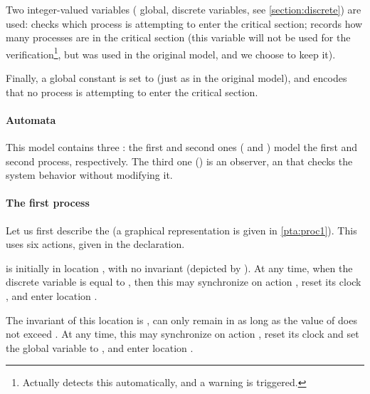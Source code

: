 Two integer-valued variables (\ie{} global, discrete variables, see \cref{section:discrete}) are used:
 checks which process is attempting to enter the critical section;
 records how many processes are in the critical section (this variable will not be used for the verification\footnote{%
	Actually \imitator{} detects this automatically, and a warning is triggered.
}, but was used in the original \pat{} model, and we choose to keep it).

Finally, a global constant  is set to  (just as in the original \pat{} model), and encodes that no process is attempting to enter the critical section.





\paragraph{Automata}
This model contains three \IPTA{}:
the first and second ones ( and ) model the first and second process, respectively. The third one () is an observer, \ie{} an \IPTA{} that checks the system behavior without modifying it.

\paragraph{The first process}
Let us first describe the \IPTA{}  (a graphical representation is given in \cref{pta:proc1}).
This \IPTA{} uses six actions, given in the  declaration.

 is initially in location , with no invariant (depicted by ).
At any time, when the discrete variable  is equal to , then this \IPTA{} may synchronize on action , reset its clock , and enter location .

The invariant of this location is , \ie{}  can only remain in  as long as the value of  does not exceed .
At any time, this \IPTA{} may synchronize on action , reset its clock  and set the global variable  to , and enter location .

